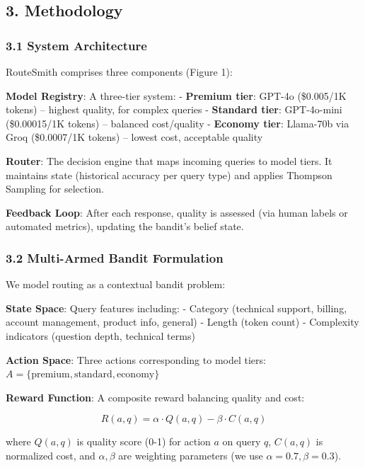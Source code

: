 \documentclass[
]{article}
\begin{document}
\hypertarget{methodology}{%
\subsection{3. Methodology}\label{methodology}}

\hypertarget{system-architecture}{%
\subsubsection{3.1 System Architecture}\label{system-architecture}}

RouteSmith comprises three components (Figure 1):

\textbf{Model Registry}: A three-tier system: - \textbf{Premium tier}:
GPT-4o (\$0.005/1K tokens) -- highest quality, for complex queries -
\textbf{Standard tier}: GPT-4o-mini (\$0.00015/1K tokens) -- balanced
cost/quality - \textbf{Economy tier}: Llama-70b via Groq (\$0.0007/1K
tokens) -- lowest cost, acceptable quality

\textbf{Router}: The decision engine that maps incoming queries to model
tiers. It maintains state (historical accuracy per query type) and
applies Thompson Sampling for selection.

\textbf{Feedback Loop}: After each response, quality is assessed (via
human labels or automated metrics), updating the bandit's belief state.

\hypertarget{multi-armed-bandit-formulation}{%
\subsubsection{3.2 Multi-Armed Bandit
Formulation}\label{multi-armed-bandit-formulation}}

We model routing as a contextual bandit problem:

\textbf{State Space}: Query features including: - Category (technical
support, billing, account management, product info, general) - Length
(token count) - Complexity indicators (question depth, technical terms)

\textbf{Action Space}: Three actions corresponding to model tiers:
\(A = \{\text{premium}, \text{standard}, \text{economy}\}\)

\textbf{Reward Function}: A composite reward balancing quality and cost:

\[R(a, q) = \alpha \cdot Q(a, q) - \beta \cdot C(a, q)\]

where \(Q(a,q)\) is quality score (0-1) for action \(a\) on query \(q\),
\(C(a,q)\) is normalized cost, and \(\alpha, \beta\) are weighting
parameters (we use \(\alpha=0.7, \beta=0.3\)).
\end{document}
